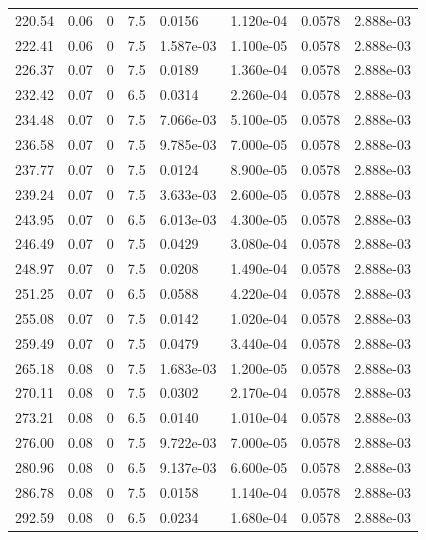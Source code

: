 \documentclass[preview]{standalone}
\begin{document}
{{{{\begin{tabular}{L{1.2cm}C{1.2cm} C{0.3cm}C{0.5cm} C{1.4cm}C{1.4cm} C{1.4cm}C{1.4cm}}
  220.54  &  0.06  & 0     & 7.5 &  0.0156  & 1.120e-04  & 0.0578 &  2.888e-03   \\ 
  222.41  &  0.06  & 0     & 7.5 &  1.587e-03  & 1.100e-05  & 0.0578 &  2.888e-03   \\ 
  226.37  &  0.07  & 0     & 7.5 &  0.0189  & 1.360e-04  & 0.0578 &  2.888e-03   \\ 
  232.42  &  0.07  & 0     & 6.5 &  0.0314  & 2.260e-04  & 0.0578 &  2.888e-03   \\ 
  234.48  &  0.07  & 0     & 7.5 &  7.066e-03  & 5.100e-05  & 0.0578 &  2.888e-03   \\ 
  236.58  &  0.07  & 0     & 7.5 &  9.785e-03  & 7.000e-05  & 0.0578 &  2.888e-03   \\ 
  237.77  &  0.07  & 0     & 7.5 &  0.0124  & 8.900e-05  & 0.0578 &  2.888e-03   \\ 
  239.24  &  0.07  & 0     & 7.5 &  3.633e-03  & 2.600e-05  & 0.0578 &  2.888e-03   \\ 
  243.95  &  0.07  & 0     & 6.5 &  6.013e-03  & 4.300e-05  & 0.0578 &  2.888e-03   \\ 
  246.49  &  0.07  & 0     & 7.5 &  0.0429  & 3.080e-04  & 0.0578 &  2.888e-03   \\ 
  248.97  &  0.07  & 0     & 7.5 &  0.0208  & 1.490e-04  & 0.0578 &  2.888e-03   \\ 
  251.25  &  0.07  & 0     & 6.5 &  0.0588  & 4.220e-04  & 0.0578 &  2.888e-03   \\ 
  255.08  &  0.07  & 0     & 7.5 &  0.0142  & 1.020e-04  & 0.0578 &  2.888e-03   \\ 
  259.49  &  0.07  & 0     & 7.5 &  0.0479  & 3.440e-04  & 0.0578 &  2.888e-03   \\ 
  265.18  &  0.08  & 0     & 7.5 &  1.683e-03  & 1.200e-05  & 0.0578 &  2.888e-03   \\ 
  270.11  &  0.08  & 0     & 7.5 &  0.0302  & 2.170e-04  & 0.0578 &  2.888e-03   \\ 
  273.21  &  0.08  & 0     & 6.5 &  0.0140  & 1.010e-04  & 0.0578 &  2.888e-03   \\ 
  276.00  &  0.08  & 0     & 7.5 &  9.722e-03  & 7.000e-05  & 0.0578 &  2.888e-03   \\ 
  280.96  &  0.08  & 0     & 6.5 &  9.137e-03  & 6.600e-05  & 0.0578 &  2.888e-03   \\ 
  286.78  &  0.08  & 0     & 7.5 &  0.0158  & 1.140e-04  & 0.0578 &  2.888e-03   \\ 
  292.59  &  0.08  & 0     & 6.5 &  0.0234  & 1.680e-04  & 0.0578 &  2.888e-03   \\ 

\end{tabular}}}}}
\end{document}
